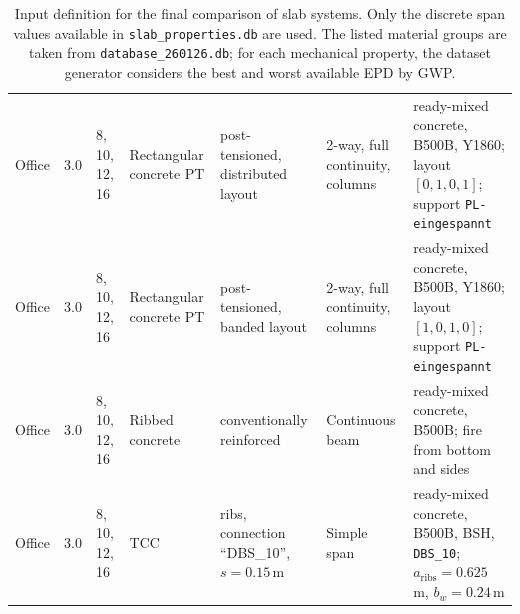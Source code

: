 \begin{table}[t]
\begin{tabularx}{\textwidth}{@{}l|c|l|X|X|X|X@{}}
    Office & 3.0 & 8, 10, 12, 16 &
    Rectangular concrete PT &
    post-tensioned, distributed layout &
    2-way, full continuity, columns &
    ready-mixed concrete, B500B, Y1860; layout $[0,1,0,1]$; support \texttt{PL-eingespannt} \\

    Office & 3.0 & 8, 10, 12, 16 &
    Rectangular concrete PT &
    post-tensioned, banded layout &
    2-way, full continuity, columns &
    ready-mixed concrete, B500B, Y1860; layout $[1,0,1,0]$; support \texttt{PL-eingespannt} \\

    Office & 3.0 & 8, 10, 12, 16 &
    Ribbed concrete &
    conventionally reinforced &
    Continuous beam &
    ready-mixed concrete, B500B; fire from bottom and sides \\

    Office & 3.0 & 8, 10, 12, 16 &
    TCC &
    ribs, connection ``DBS\_10'', $s=0.15$\,m &
    Simple span &
    ready-mixed concrete, B500B, BSH, \texttt{DBS\_10}; $a_{\mathrm{ribs}}=0.625$\,m, $b_w=0.24$\,m \\ \hline
    \end{tabularx}
    \endgroup
    \caption{Input definition for the final comparison of slab systems. Only the discrete span values available in \texttt{slab\_properties.db} are used. The listed material groups are taken from \texttt{database\_260126.db}; for each mechanical property, the dataset generator considers the best and worst available EPD by GWP.}
\end{table}


